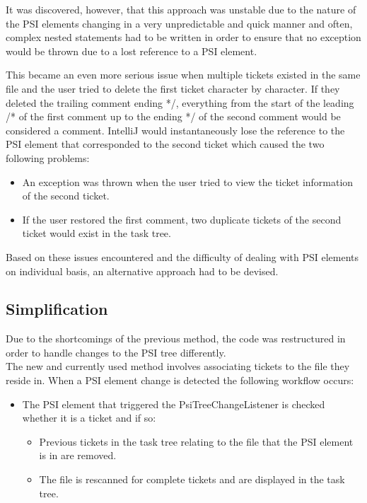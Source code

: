 \documentclass{4thYearProject}
\begin{document}
It was discovered, however, that this approach was unstable due to the nature of the PSI elements changing in a very unpredictable and quick manner and often, complex nested statements had to be written in order to ensure that no exception would be thrown due to a lost reference to a PSI element. 

This became an even more serious issue when multiple tickets existed in the same file and the user tried to delete the first ticket character by character. If they deleted the trailing comment ending */, everything from the start of the leading /* of the first comment up to the ending */ of the second comment would be considered a comment. IntelliJ would instantaneously lose the reference to the PSI element that corresponded to the second ticket which caused the two following problems:

\begin{itemize}
\item An exception was thrown when the user tried to view the ticket information of the second ticket.
\item If the user restored the first comment, two duplicate tickets of the second ticket would exist in the task tree.
\end{itemize}

Based on these issues encountered and the difficulty of dealing with PSI elements on individual basis, an alternative approach had to be devised.

\subsection{Simplification}

Due to the shortcomings of the previous method, the code was restructured in order to handle changes to the PSI tree differently. \\
The new and currently used method involves associating tickets to the file they reside in. When a PSI element change is detected the following workflow occurs:

\begin{itemize}
\item The PSI element that triggered the PsiTreeChangeListener is checked whether it is a ticket and if so:
\begin{itemize}
\item Previous tickets in the task tree relating to the file that the PSI element is in are removed.
\item The file is rescanned for complete tickets and are displayed in the task tree. 
\end{itemize}
\end{itemize}
\end{document}
